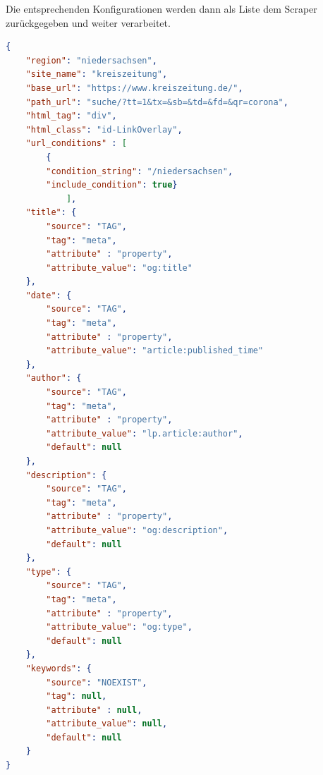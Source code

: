 \documentclass[12pt,oneside,a4paper,parskip]{scrbook}
\begin{document}
Die entsprechenden Konfigurationen werden dann als Liste dem Scraper zurückgegeben und weiter verarbeitet.
\begin{lstlisting}[caption=article\_config am Beispiel Niedersachsen,label=articleconfig,language=json]
{
    "region": "niedersachsen",
    "site_name": "kreiszeitung",
    "base_url": "https://www.kreiszeitung.de/",
    "path_url": "suche/?tt=1&tx=&sb=&td=&fd=&qr=corona",
    "html_tag": "div",
    "html_class": "id-LinkOverlay",
    "url_conditions" : [
        {
        "condition_string": "/niedersachsen",
        "include_condition": true}
        	],
    "title": {
        "source": "TAG",
        "tag": "meta",
        "attribute" : "property",
        "attribute_value": "og:title"
    },
    "date": {
        "source": "TAG",
        "tag": "meta",
        "attribute" : "property",
        "attribute_value": "article:published_time"
    },
    "author": {
        "source": "TAG",
        "tag": "meta",
        "attribute" : "property",
        "attribute_value": "lp.article:author",
        "default": null
    },
    "description": {
        "source": "TAG",
        "tag": "meta",
        "attribute" : "property",
        "attribute_value": "og:description",
        "default": null
    },
    "type": {
        "source": "TAG",
        "tag": "meta",
        "attribute" : "property",
        "attribute_value": "og:type",
        "default": null
    },
    "keywords": {
        "source": "NOEXIST",
        "tag": null,
        "attribute" : null,
        "attribute_value": null,
        "default": null
    }
}
\end{lstlisting}
\end{document}

